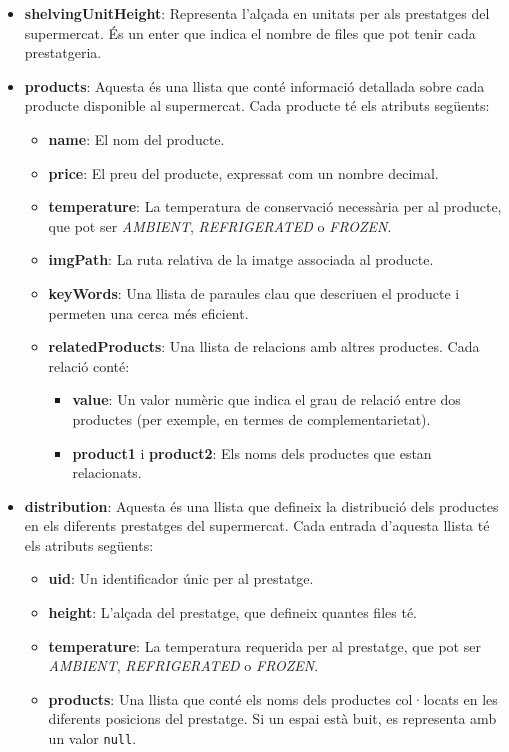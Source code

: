 \documentclass[a4paper,12pt]{report}
\begin{document}
\begin{itemize}
\begin{itemize}
	\item \textbf{shelvingUnitHeight}: Representa l'alçada en unitats per als prestatges del supermercat. És un enter que indica el nombre de files que pot tenir cada prestatgeria.

	\item \textbf{products}: Aquesta és una llista que conté informació detallada sobre cada producte disponible al supermercat. Cada producte té els atributs següents:
	      \begin{itemize}
		      \item \textbf{name}: El nom del producte.
		      \item \textbf{price}: El preu del producte, expressat com un nombre decimal.
		      \item \textbf{temperature}: La temperatura de conservació necessària per al producte, que pot ser \textit{AMBIENT}, \textit{REFRIGERATED} o \textit{FROZEN}.
		      \item \textbf{imgPath}: La ruta relativa de la imatge associada al producte.
		      \item \textbf{keyWords}: Una llista de paraules clau que descriuen el producte i permeten una cerca més eficient.
		      \item \textbf{relatedProducts}: Una llista de relacions amb altres productes. Cada relació conté:
		            \begin{itemize}
			            \item \textbf{value}: Un valor numèric que indica el grau de relació entre dos productes (per exemple, en termes de complementarietat).
			            \item \textbf{product1} i \textbf{product2}: Els noms dels productes que estan relacionats.
		            \end{itemize}
	      \end{itemize}

	\item \textbf{distribution}: Aquesta és una llista que defineix la distribució dels productes en els diferents prestatges del supermercat. Cada entrada d'aquesta llista té els atributs següents:
	      \begin{itemize}
		      \item \textbf{uid}: Un identificador únic per al prestatge.
		      \item \textbf{height}: L'alçada del prestatge, que defineix quantes files té.
		      \item \textbf{temperature}: La temperatura requerida per al prestatge, que pot ser \textit{AMBIENT}, \textit{REFRIGERATED} o \textit{FROZEN}.
		      \item \textbf{products}: Una llista que conté els noms dels productes col·locats en les diferents posicions del prestatge. Si un espai està buit, es representa amb un valor \texttt{null}.
	      \end{itemize}
\end{itemize}


\end{itemize}
\end{document}
